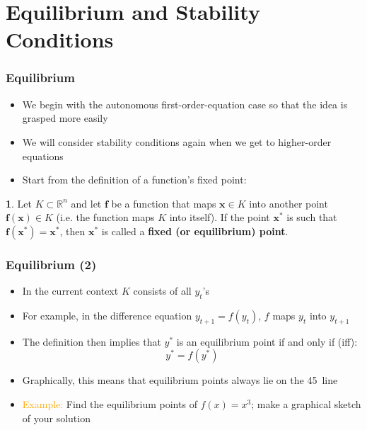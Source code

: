 \documentclass[10pt,usenames,dvipsnames]{beamer}
\theoremstyle{definition}
\newtheorem{definition}{\translate{Definition}}
\begin{document}
\section{Equilibrium and Stability Conditions}
\begin{frame}[fragile]
\frametitle{Equilibrium}

\begin{itemize}
	\item We begin with the autonomous first-order-equation case so that the idea is grasped more easily
	\item We will consider stability conditions again when we get to higher-order equations
	\item Start from the definition of a function's fixed point:
\end{itemize}

\begin{definition}
Let $K \subset \mathbb{R}^{n}$ and let $\mathbf{f}$ be a function that maps $\mathbf{x} \in K$ into another point $\mathbf{f}(\mathbf{x})\in K$ (i.e. the function maps $K$ into itself). If the point $\mathbf{x}^{*}$ is such that $\mathbf{f}(\mathbf{x}^{*}) = \mathbf{x}^{*}$, then $\mathbf{x}^{*}$ is called a \textbf{fixed (or equilibrium) point}.
\end{definition}

\end{frame}

\begin{frame}[fragile]
\frametitle{Equilibrium (2)}
\begin{itemize}
	\item In the current context $K$ consists of all $y_{t}$'s
	\item For example, in the difference equation $y_{t+1} = f(y_{t})$, $f$ maps $y_{t}$ into $y_{t+1}$
	\item The definition then implies that $y^{*}$ is an equilibrium point if and only if (iff):
	\[
		y^{*} = f(y^{*})
	\]
	\item Graphically, this means that equilibrium points always lie on the 45\degree\ line
	\item \textcolor{orange}{Example:} Find the equilibrium points of $f(x) = x^{3}$; make a graphical sketch of your solution
\end{itemize}
\end{frame}
\end{document}
